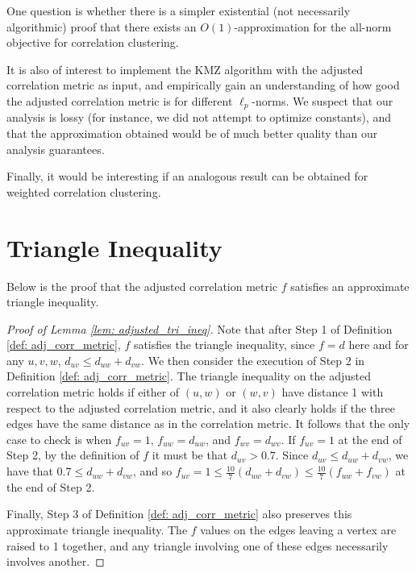 \documentclass[11pt]{article}
\begin{document}
One question is whether there is a simpler existential (not necessarily algorithmic) proof that there exists an $O(1)$-approximation for the all-norm objective for correlation clustering.

It is also of interest to implement the KMZ algorithm with the adjusted correlation metric as input, and empirically gain an understanding of how good the adjusted correlation metric is for different $\ell_p$-norms. We suspect that our analysis is lossy (for instance, we did not attempt to optimize constants), and that the approximation obtained would be of much better quality than our analysis guarantees.

Finally, it would be interesting if an analogous result can be obtained for weighted correlation clustering.  

\newpage 



\newpage 

\appendix

\section{Triangle Inequality} \label{sec: tri_ineq}

Below is the proof that the adjusted correlation metric $f$ satisfies an approximate triangle inequality. 

\begin{proof}[Proof of Lemma \ref{lem: adjusted_tri_ineq}]
    Note that after Step 1 of Definition \ref{def: adj_corr_metric}, $f$ satisfies the triangle inequality, since $f=d$ here and for any $u,v,w$, $d_{uv} \leq d_{uw}+d_{vw}.$
    We then consider the execution of Step 2 in Definition \ref{def: adj_corr_metric}.
    The triangle inequality on the adjusted correlation metric holds if either of $(u,w)$ or $(w,v)$ have distance 1 with respect to the adjusted correlation metric, and it also clearly holds if the three edges have the same distance as in the correlation metric. 
    It follows that the only case to check is when $f_{uv}=1$, $f_{uw}=d_{uw}$, and $f_{wv}=d_{wv}$.
    If $f_{uv}=1$ at the end of Step 2, by the definition of $f$ it must be that $d_{uv} > 0.7$.
    Since $d_{uv} \leq d_{uw}+d_{vw}$, we have that $0.7 \leq d_{uw}+d_{vw}$, 
    and so $f_{uv}=1 \leq \frac{10}{7}(d_{uw}+d_{vw}) \leq \frac{10}{7}(f_{uw}+f_{vw})$ at the end of Step 2.
    
    Finally, Step 3 of Definition \ref{def: adj_corr_metric} also preserves this approximate triangle inequality. 
    The $f$ values on the edges leaving a vertex are raised to 1 together, and any triangle involving one of these edges necessarily involves another.
\end{proof}
\end{document}
